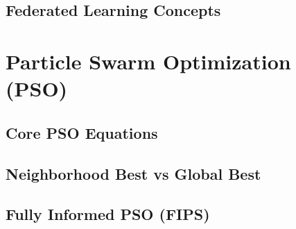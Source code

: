 \subsection{Federated Learning Concepts}

\section{Particle Swarm Optimization (PSO)}
\subsection{Core PSO Equations}

\subsection{Neighborhood Best vs Global Best}

\subsection{Fully Informed PSO (FIPS)}
